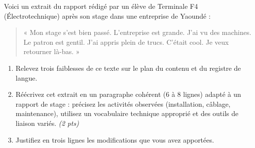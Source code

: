 \documentclass[11pt]{article}
\begin{document}
\begin{exercice}
Voici un extrait du rapport rédigé par un élève de Terminale F4 (Électrotechnique) après son stage dans une entreprise de Yaoundé :

\begin{quote}
« Mon stage s'est bien passé. L'entreprise est grande. J'ai vu des machines. Le patron est gentil. J'ai appris plein de trucs. C'était cool. Je veux retourner là-bas. »
\end{quote}

\begin{enumerate}
\item Relevez trois faiblesses de ce texte sur le plan du contenu et du registre de langue.
\item Réécrivez cet extrait en un paragraphe cohérent (6 à 8 lignes) adapté à un rapport de stage : précisez les activités observées (installation, câblage, maintenance), utilisez un vocabulaire technique approprié et des outils de liaison variés. \textit{(2 pts)}
\item Justifiez en trois lignes les modifications que vous avez apportées.
\end{enumerate}
\end{exercice}
\end{document}
